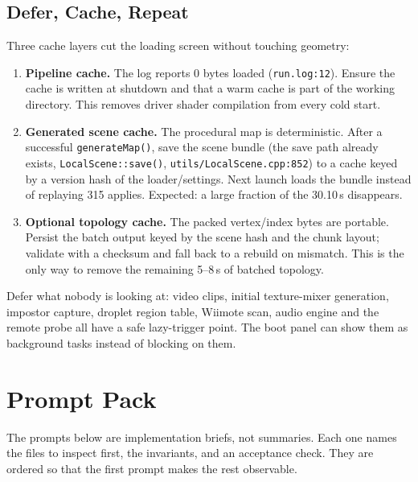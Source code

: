 \documentclass[11pt,a4paper]{article}
\begin{document}
\subsection{Defer, Cache, Repeat}

Three cache layers cut the loading screen without touching geometry:

\begin{enumerate}[leftmargin=1.5em,itemsep=2pt]
\item \textbf{Pipeline cache.} The log reports 0 bytes loaded
(\texttt{run.log:12}). Ensure the cache is written at shutdown and that a
warm cache is part of the working directory. This removes driver shader
compilation from every cold start.
\item \textbf{Generated scene cache.} The procedural map is deterministic.
After a successful \texttt{generateMap()}, save the scene bundle (the save
path already exists, \texttt{LocalScene::save()},
\texttt{utils/LocalScene.cpp:852}) to a cache keyed by a version hash of the
loader/settings. Next launch loads the bundle instead of replaying 315
applies. Expected: a large fraction of the 30.10\,s disappears.
\item \textbf{Optional topology cache.} The packed vertex/index bytes are
portable. Persist the batch output keyed by the scene hash and the chunk
layout; validate with a checksum and fall back to a rebuild on mismatch. This
is the only way to remove the remaining 5--8\,s of batched topology.
\end{enumerate}

Defer what nobody is looking at: video clips, initial texture-mixer
generation, impostor capture, droplet region table, Wiimote scan, audio
engine and the remote probe all have a safe lazy-trigger point. The boot
panel can show them as background tasks instead of blocking on them.

\section{Prompt Pack}

The prompts below are implementation briefs, not summaries. Each one names
the files to inspect first, the invariants, and an acceptance check. They are
ordered so that the first prompt makes the rest observable.
\end{document}
